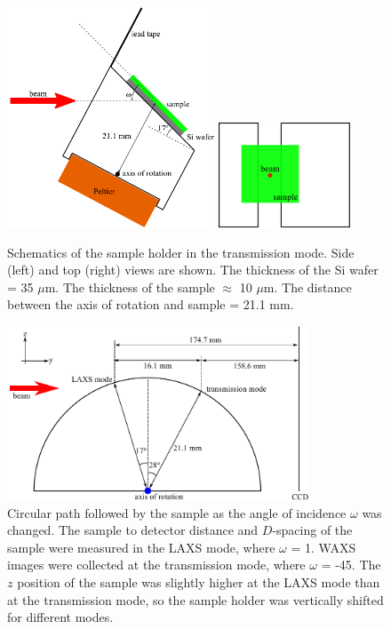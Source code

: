 \begin{figure}[htbp]
  \centering
  \includegraphics[width=0.55\textwidth]{figures/ripple/MMs/transmission/holder_side}
  \includegraphics[width=0.35\textwidth]{figures/ripple/MMs/transmission/holder_top}
  \caption{Schematics of the sample holder in the transmission mode.
  Side (left) and top (right) views are shown. The thickness of the Si wafer
  = 35 $\mu$m. The thickness of the sample $\approx$ 10 $\mu$m. The
  distance between the axis of rotation and sample = 21.1 mm.}
  \label{fig:holder_schematic}
\end{figure}

\begin{figure}[htbp]
  \centering
  \includegraphics[width=0.8\textwidth]{figures/ripple/MMs/transmission/sgeometry}
  \caption{Circular path followed by the sample 
  as the angle of incidence $\omega$ was changed. The sample to detector distance and 
  $D$-spacing of the sample were measured in the LAXS mode, where $\omega$ = 1\textdegree. WAXS images
  were collected at the transmission mode, where $\omega$ = -45\textdegree. 
  The $z$ position of the sample was
  slightly higher at the LAXS mode than at the transmission mode, so the 
  sample holder was vertically shifted for different modes.}
  \label{fig:sgeometry}
\end{figure}
\newpage
